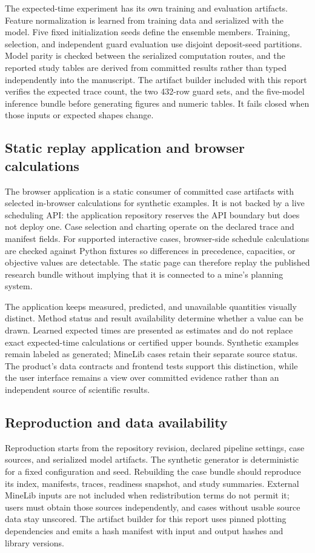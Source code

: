 The expected-time experiment has its own training and evaluation artifacts. Feature normalization is learned from training data and serialized with the model. Five fixed initialization seeds define the ensemble members. Training, selection, and independent guard evaluation use disjoint deposit-seed partitions. Model parity is checked between the serialized computation routes, and the reported study tables are derived from committed results rather than typed independently into the manuscript. The artifact builder included with this report verifies the expected trace count, the two 432-row guard sets, and the five-model inference bundle before generating figures and numeric tables. It fails closed when those inputs or expected shapes change.

\subsection{Static replay application and browser calculations}
The browser application is a static consumer of committed case artifacts with selected in-browser calculations for synthetic examples. It is not backed by a live scheduling API: the application repository reserves the API boundary but does not deploy one. Case selection and charting operate on the declared trace and manifest fields. For supported interactive cases, browser-side schedule calculations are checked against Python fixtures so differences in precedence, capacities, or objective values are detectable. The static page can therefore replay the published research bundle without implying that it is connected to a mine's planning system.

The application keeps measured, predicted, and unavailable quantities visually distinct. Method status and result availability determine whether a value can be drawn. Learned expected times are presented as estimates and do not replace exact expected-time calculations or certified upper bounds. Synthetic examples remain labeled as generated; MineLib cases retain their separate source status. The product's data contracts and frontend tests support this distinction, while the user interface remains a view over committed evidence rather than an independent source of scientific results.

\subsection{Reproduction and data availability}
Reproduction starts from the repository revision, declared pipeline settings, case sources, and serialized model artifacts. The synthetic generator is deterministic for a fixed configuration and seed. Rebuilding the case bundle should reproduce its index, manifests, traces, readiness snapshot, and study summaries. External MineLib inputs are not included when redistribution terms do not permit it; users must obtain those sources independently, and cases without usable source data stay unscored. The artifact builder for this report uses pinned plotting dependencies and emits a hash manifest with input and output hashes and library versions.


